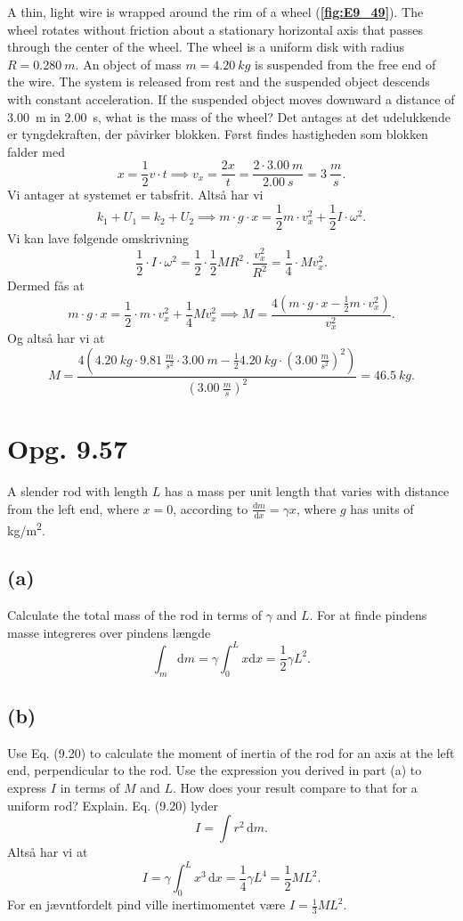 \documentclass[12pt]{article}
\begin{document}
A thin, light wire is wrapped around the rim of a wheel (\textbf{\autoref{fig:E9_49}}). The wheel rotates without friction about a stationary horizontal axis that passes through the center of the wheel. The wheel is a uniform disk with radius $R = \qty{0,280}{m}$. An object of mass $m = \qty{4,20}{kg}$ is suspended from the free end of the wire. The system is released from rest and the suspended object descends with constant acceleration. If the suspended object moves downward a distance of \qty{3,00}{m} in \qty{2,00}{s}, what is the mass of the wheel?
\bigbreak
Det antages at det udelukkende er tyngdekraften, der påvirker blokken. Først findes hastigheden som blokken falder med
\[
x = \frac{1}{2}v\cdot t \implies v_x = \frac{2x}{t} = \frac{2\cdot \qty{3,00}{m}}{\qty{2,00}{s}} = \qty{3}{\frac{m}{s}}
.\] 
Vi antager at systemet er tabsfrit. Altså har vi
\[
  k_1 + U_1 = k_2 + U_2 \implies m\cdot g\cdot x = \frac{1}{2}m\cdot v_x^2 + \frac{1}{2}I\cdot \omega^2
.\] 
Vi kan lave følgende omskrivning
\[
\frac{1}{2}\cdot I\cdot \omega^2 = \frac{1}{2}\cdot \frac{1}{2}MR^2 \cdot  \frac{v_x^2}{R^2} = \frac{1}{4}\cdot Mv_x^2
.\] 
Dermed fås at
\[
  m\cdot g\cdot x = \frac{1}{2}\cdot m\cdot v_x^2 + \frac{1}{4}Mv_x^2 \implies M = \frac{4 \left( m\cdot g\cdot x - \frac{1}{2}m\cdot v_x^2 \right)}{v_x^2}
.\] 
Og altså har vi at
\[
  M = \frac{4 \left( \qty{4,20}{kg}\cdot \qty{9,81}{\frac{m}{s^2}\cdot \qty{3,00}{m}} - \frac{1}{2} \qty{4,20}{kg}\cdot (\qty{3,00}{\frac{m}{s^2}})^2 \right) }{(\qty{3,00}{\frac{m}{s}})^2} = \qty{46,5}{kg}
.\]


\section*{Opg. 9.57}
A slender rod with length $L$ has a mass per unit length that varies with distance from the left end, where $x = 0$, according to $\frac{\mathrm{d}m}{\mathrm{d}x} = \gamma x$, where $g$ has units of \unit{kg/m^2}.


\subsection*{(a)}
Calculate the total mass of the rod in terms of $\gamma$ and $L$.
\bigbreak
For at finde pindens masse integreres over pindens længde
\[
\int_m  \mathrm{d}m = \gamma \int_0^L x \mathrm{d}x = \frac{1}{2}\gamma L^2 
.\] 

\subsection*{(b)}
Use Eq. (9.20) to calculate the moment of inertia of the rod for an axis at the left end, perpendicular to the rod. Use the expression you derived in part (a) to express $I$ in terms of $M$ and $L$. How does your result compare to that for a uniform rod? Explain.
\bigbreak
Eq. (9.20) lyder
\[
I = \int r^2 \, \mathrm{d}m
.\] 
Altså har vi at
\[
I = \gamma \int_0^L x^3 \, \mathrm{d}x = \frac{1}{4}\gamma L^4 = \frac{1}{2}ML^2
.\]
For en jævntfordelt pind ville inertimomentet være $I = \frac{1}{3}ML^2$.
\end{document}
